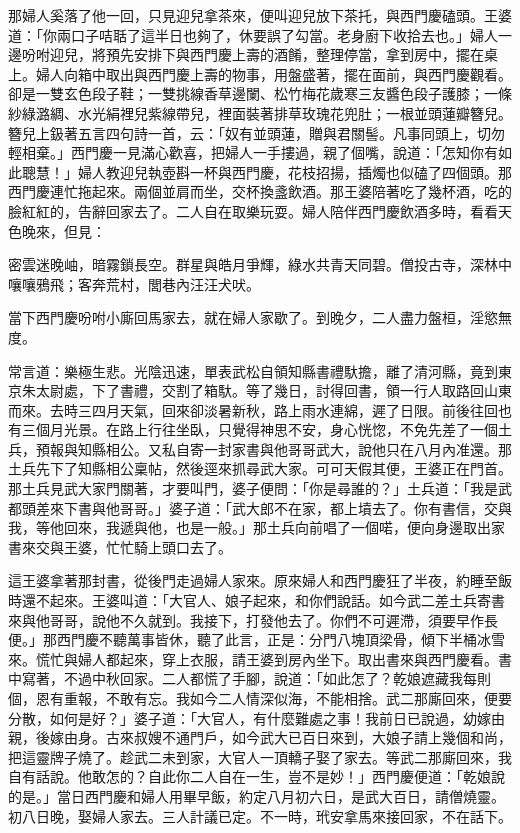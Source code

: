 \begin{showcontents}{}
那婦人奚落了他一回，只見迎兒拿茶來，便叫迎兒放下茶托，與西門慶磕頭。王婆道：「你兩口子咭聒了這半日也夠了，休要誤了勾當。老身廚下收拾去也。」婦人一邊吩咐迎兒，將預先安排下與西門慶上壽的酒餚，整理停當，拿到房中，擺在桌上。婦人向箱中取出與西門慶上壽的物事，用盤盛著，擺在面前，與西門慶觀看。卻是一雙玄色段子鞋；一雙挑線香草邊闌、松竹梅花歲寒三友醬色段子護膝；一條紗綠潞綢、水光絹裡兒紫線帶兒，裡面裝著排草玫瑰花兜肚；一根並頭蓮瓣簪兒。簪兒上鈒著五言四句詩一首，云：「奴有並頭蓮，贈與君關髻。凡事同頭上，切勿輕相棄。」西門慶一見滿心歡喜，把婦人一手摟過，親了個嘴，說道：「怎知你有如此聰慧！」婦人教迎兒執壺斟一杯與西門慶，花枝招揚，插燭也似磕了四個頭。那西門慶連忙拖起來。兩個並肩而坐，交杯換盞飲酒。那王婆陪著吃了幾杯酒，吃的臉紅紅的，告辭回家去了。二人自在取樂玩耍。婦人陪伴西門慶飲酒多時，看看天色晚來，但見：

密雲迷晚岫，暗霧鎖長空。群星與皓月爭輝，綠水共青天同碧。僧投古寺，深林中嚷嚷鴉飛；客奔荒村，閭巷內汪汪犬吠。

當下西門慶吩咐小廝回馬家去，就在婦人家歇了。到晚夕，二人盡力盤桓，淫慾無度。

常言道：樂極生悲。光陰迅速，單表武松自領知縣書禮馱擔，離了清河縣，竟到東京朱太尉處，下了書禮，交割了箱馱。等了幾日，討得回書，領一行人取路回山東而來。去時三四月天氣，回來卻淡暑新秋，路上雨水連綿，遲了日限。前後往回也有三個月光景。在路上行往坐臥，只覺得神思不安，身心恍惚，不免先差了一個土兵，預報與知縣相公。又私自寄一封家書與他哥哥武大，說他只在八月內准還。那土兵先下了知縣相公稟帖，然後逕來抓尋武大家。可可天假其便，王婆正在門首。那土兵見武大家門關著，才要叫門，婆子便問：「你是尋誰的？」土兵道：「我是武都頭差來下書與他哥哥。」婆子道：「武大郎不在家，都上墳去了。你有書信，交與我，等他回來，我遞與他，也是一般。」那土兵向前唱了一個喏，便向身邊取出家書來交與王婆，忙忙騎上頭口去了。

這王婆拿著那封書，從後門走過婦人家來。原來婦人和西門慶狂了半夜，約睡至飯時還不起來。王婆叫道：「大官人、娘子起來，和你們說話。如今武二差土兵寄書來與他哥哥，說他不久就到。我接下，打發他去了。你們不可遲滯，須要早作長便。」那西門慶不聽萬事皆休，聽了此言，正是：分門八塊頂梁骨，傾下半桶冰雪來。慌忙與婦人都起來，穿上衣服，請王婆到房內坐下。取出書來與西門慶看。書中寫著，不過中秋回家。二人都慌了手腳，說道：「如此怎了？乾娘遮藏我每則個，恩有重報，不敢有忘。我如今二人情深似海，不能相捨。武二那廝回來，便要分散，如何是好？」婆子道：「大官人，有什麼難處之事！我前日已說過，幼嫁由親，後嫁由身。古來叔嫂不通門戶，如今武大已百日來到，大娘子請上幾個和尚，把這靈牌子燒了。趁武二未到家，大官人一頂轎子娶了家去。等武二那廝回來，我自有話說。他敢怎的？自此你二人自在一生，豈不是妙！」西門慶便道：「乾娘說的是。」當日西門慶和婦人用畢早飯，約定八月初六日，是武大百日，請僧燒靈。初八日晚，娶婦人家去。三人計議已定。不一時，玳安拿馬來接回家，不在話下。


\end{showcontents}
